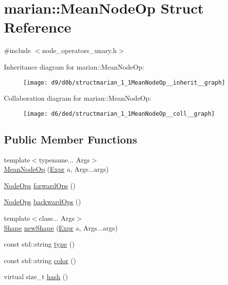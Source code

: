 \hypertarget{structmarian_1_1MeanNodeOp}{}\section{marian\+:\+:Mean\+Node\+Op Struct Reference}
\label{structmarian_1_1MeanNodeOp}


{\ttfamily \#include $<$node\+\_\+operators\+\_\+unary.\+h$>$}



Inheritance diagram for marian\+:\+:Mean\+Node\+Op\+:
\nopagebreak
\begin{figure}[H]
\begin{center}
\leavevmode
\texttt{[image: d9/d0b/structmarian\_1\_1MeanNodeOp\_\_inherit\_\_graph]}
\end{center}
\end{figure}


Collaboration diagram for marian\+:\+:Mean\+Node\+Op\+:
\nopagebreak
\begin{figure}[H]
\begin{center}
\leavevmode
\texttt{[image: d6/ded/structmarian\_1\_1MeanNodeOp\_\_coll\_\_graph]}
\end{center}
\end{figure}
\subsection*{Public Member Functions}
\begin{DoxyCompactItemize}
\item 
{\footnotesize template$<$typename... Args$>$ }\\\hyperlink{structmarian_1_1MeanNodeOp_ad07d3567d7f72f2feb462a60c5881abd}{Mean\+Node\+Op} (\hyperlink{namespacemarian_a498d8baf75b754011078b890b39c8e12}{Expr} a, Args...\+args)
\item 
\hyperlink{namespacemarian_a4956376218cc236016c20bc4071470da}{Node\+Ops} \hyperlink{structmarian_1_1MeanNodeOp_a381e225665df25b105acaab9c60818d3}{forward\+Ops} ()
\item 
\hyperlink{namespacemarian_a4956376218cc236016c20bc4071470da}{Node\+Ops} \hyperlink{structmarian_1_1MeanNodeOp_a6ea05faab13f92bf40430274016db0f6}{backward\+Ops} ()
\item 
{\footnotesize template$<$class... Args$>$ }\\\hyperlink{structmarian_1_1Shape}{Shape} \hyperlink{structmarian_1_1MeanNodeOp_a21514a578bd7952b2d863cd164279baf}{new\+Shape} (\hyperlink{namespacemarian_a498d8baf75b754011078b890b39c8e12}{Expr} a, Args...\+args)
\item 
const std\+::string \hyperlink{structmarian_1_1MeanNodeOp_a4d61e4573be915e1d0bbeb463aab54d6}{type} ()
\item 
const std\+::string \hyperlink{structmarian_1_1MeanNodeOp_a695658ac77c947c09a49e8520f8879b3}{color} ()
\item 
virtual size\+\_\+t \hyperlink{structmarian_1_1MeanNodeOp_a9cffc1e5e7ccf48c08cba8ec8432bebb}{hash} ()
\end{DoxyCompactItemize}
